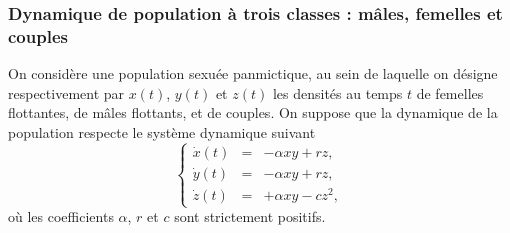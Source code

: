 \subsubsection{Dynamique de population à trois classes : mâles, femelles et couples}

On considère une population sexuée panmictique, au sein de laquelle on désigne
respectivement par $x(t)$, $y(t)$ et $z(t)$ les densités au temps $t$ de femelles flottantes, de mâles flottants, et de couples. On suppose que la dynamique de la population respecte le système dynamique suivant
\begin{equation} \label{eq:Dyn3Pop}
  \left\{\begin{array}{rcl}
          \dot x(t) & = & - \alpha x y + r z, \\
          \dot y(t) & = & - \alpha x y + r z, \\
          \dot z(t) & = & + \alpha x y - c z^2,
          \end{array} \right.
\end{equation}
où les coefficients $\alpha$, $r$ et $c$ sont strictement positifs.
